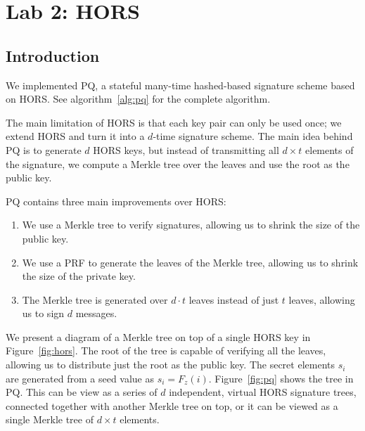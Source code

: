 \documentclass[10pt]{article}
\begin{document}
\clearpage
\section{Lab 2: HORS}
\subsection{Introduction}

We implemented PQ, a stateful many-time hashed-based signature scheme based on HORS.
See algorithm~\ref{alg:pq} for the complete algorithm.

The main limitation of HORS is that each key pair can only be used once;
we extend HORS and turn it into a $d$-time signature scheme.
The main idea behind PQ is to generate $d$ HORS keys, but instead of transmitting all $d\times t$ elements of the signature, we compute a Merkle tree over the leaves and use the root as the public key.

PQ contains three main improvements over HORS:
\begin{enumerate}
\item We use a Merkle tree to verify signatures, allowing us to shrink the size of the public key.
\item We use a PRF to generate the leaves of the Merkle tree, allowing us to shrink the size of the private key.
\item The Merkle tree is generated over $d\cdot t$ leaves instead of just $t$ leaves, allowing us to sign $d$ messages.
\end{enumerate}

We present a diagram of a Merkle tree on top of a single HORS key in Figure~\ref{fig:hors}. The root of the tree is capable of verifying all the leaves, allowing us to distribute just the root as the public key. The secret elements $s_i$ are generated from a seed value as $s_i = F_z(i)$. Figure~\ref{fig:pq} shows the tree in PQ. This can be view as a series of $d$ independent, virtual HORS signature trees, connected together with another Merkle tree on top, or it can be viewed as a single Merkle tree of $d\times t$ elements.
\end{document}
